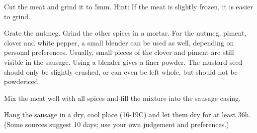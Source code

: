 Cut the meat and grind it to 5mm. Hint: If the meat is slightly frozen, it is 
easier to grind. 

Grate the nutmeg. Grind the other spices in a mortar. 
For the nutmeg, piment, clover and white pepper, a small blender can be used as well, 
depending on personal preferences. Usually, small pieces of the clover and piment 
are still visible in the sausage. Using a blender gives a finer powder.
The mustard seed should only be slightly crushed, or can even be left whole, but should not be 
powdericed.

Mix the meat well with all spices and fill the mixture into the sausage casing.

Hang the sausage in a dry, cool place (16-19\degree C) and let them dry for at least 36h. (Some
sources suggest 10 days; use your own judgement and preferences.)
